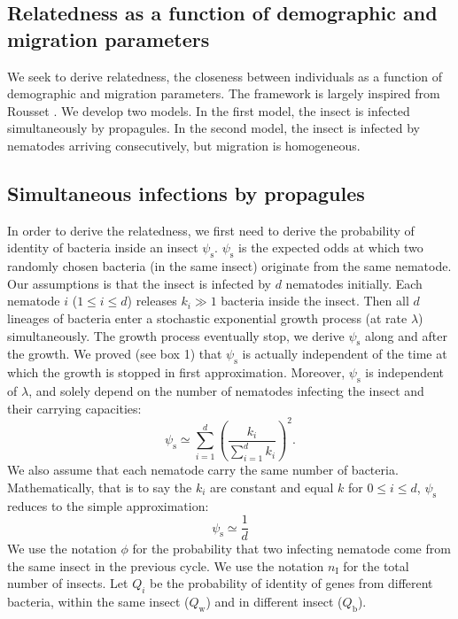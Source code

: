 \documentclass[10pt]{article}
\newcommand{\nI}{{n_\textrm{I}}}
\newcommand{\qw}{Q_\mathrm{w}}
\newcommand{\qb}{Q_\mathrm{b}}
\newcommand{\psis}{\psi_\mathrm{s}}
\begin{document}
\begin{multicols}{2}
\section*{Relatedness as a function of demographic and migration parameters}
We seek to derive relatedness, the closeness between individuals as a function of demographic and migration parameters. 
The framework is largely inspired from Rousset \cite{rousset2004genetic}.
We develop two models. 
In the first model, the insect is infected simultaneously by propagules. 
In the second model, the insect is infected by nematodes arriving consecutively, but migration is homogeneous.
\subsection*{Simultaneous infections by propagules}
In order to derive the relatedness, we first need to derive the probability of identity of bacteria inside an insect $\psis$. 
$\psis$ is the expected odds at which two randomly chosen bacteria (in the same insect) originate from the same nematode.  
Our assumptions is that the insect is infected by $d$ nematodes initially. 
Each nematode $i$ ($ 1 \leq i \leq d$) releases $k_i \gg 1$ bacteria inside the insect. 
Then all $d$ lineages of bacteria enter a stochastic exponential growth process (at rate $\lambda$) simultaneously. 
The growth process eventually stop, we derive $\psis$ along and after the growth. 
We proved (see box 1) that $\psis$ is actually independent of the time at which the growth is stopped in first approximation. 
Moreover, $\psis$ is independent of $\lambda$, and solely depend on the number of nematodes infecting the insect and their carrying capacities:
 \begin{equation}
\psis \simeq \displaystyle \sum_{i=1}^d \left( \dfrac{ k_i}{\sum_{i=1}^d k_i} \right)^2. \label{eqn:star} 
 \end{equation}
We also assume that each nematode carry the same number of bacteria. 
Mathematically, that is to say the $k_i$ are constant and equal $k$ for $0 \leq i \leq d$, $\psis$ reduces to the simple approximation:
\begin{equation}
\psis \simeq \dfrac{1}{d}
\end{equation}
We use the notation $\phi$ for the probability that two infecting nematode come from the same insect in the previous cycle.
We use the notation $\nI$ for the total number of insects.
Let $Q_i$ be the probability of identity of genes from different bacteria, within the same insect ($\qw$) and in different insect ($\qb$). 

\end{multicols}
\end{document}
